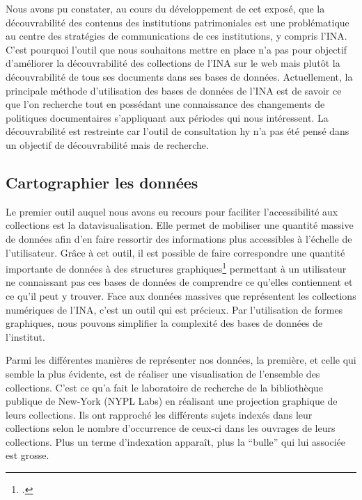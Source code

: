 Nous avons pu constater, au cours du développement de cet exposé, que la découvrabilité des contenus des institutions patrimoniales est une problématique au centre des stratégies de communications de ces institutions, y compris l'INA. C'est pourquoi l'outil que nous souhaitons mettre en place n'a pas pour objectif d'améliorer la découvrabilité des collections de l'INA sur le web mais plutôt la découvrabilité de tous ses documents dans ses bases de données. Actuellement, la principale méthode d'utilisation des bases de données de l'INA est de savoir ce que l'on recherche tout en possédant une connaissance des changements de politiques documentaires s'appliquant aux périodes qui nous intéressent. La découvrabilité est restreinte car l'outil de consultation \gls{hy} n'a pas été pensé dans un objectif de découvrabilité mais de recherche.

\subsection{Cartographier les données}

Le premier outil auquel nous avons eu recours pour faciliter l'accessibilité aux collections est la datavisualisation. Elle permet de mobiliser une quantité massive de données afin d'en faire ressortir des informations plus accessibles à l'échelle de l'utilisateur. Grâce à cet outil, il est possible de faire correspondre une quantité importante de données à des structures graphiques\footcite[][42]{fourlinnie2016} permettant à un utilisateur ne connaissant pas ces bases de données de comprendre ce qu'elles contiennent et ce qu'il peut y trouver. Face aux données massives que représentent les collections numériques de l'INA, c'est un outil qui est précieux. Par l'utilisation de formes graphiques, nous pouvons simplifier la complexité des bases de données de l'institut. 


Parmi les différentes manières de représenter nos données, la première, et celle qui semble la plus évidente, est de réaliser une visualisation de l'ensemble des collections. C'est ce qu'a fait le laboratoire de recherche de la bibliothèque publique de New-York (NYPL Labs) en réalisant une projection graphique de leurs collections. Ils ont rapproché les différents sujets indexés dans leur collections selon le nombre d’occurrence de ceux-ci dans les ouvrages de leurs collections. Plus un terme d'indexation apparaît, plus la \enquote{bulle} qui lui associée est grosse.


